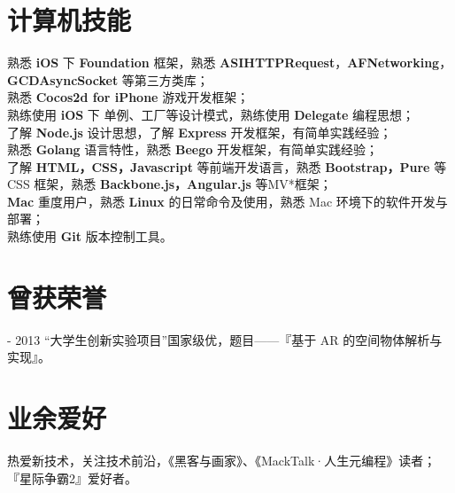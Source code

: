 \documentclass{res}
\begin{document}
\begin{resume}
\section{计算机技能}
\noindent
    熟悉 {\bf iOS} 下 {\bf Foundation} 框架，熟悉 {\bf ASIHTTPRequest}，{\bf AFNetworking}，{\bf GCDAsyncSocket} 等第三方类库；\\
    熟悉 {\bf Cocos2d for iPhone} 游戏开发框架；\\
    熟练使用 {\bf iOS} 下 单例、工厂等设计模式，熟练使用 {\bf Delegate} 编程思想；\\
    了解 {\bf Node.js} 设计思想，了解 {\bf Express} 开发框架，有简单实践经验；\\
    熟悉 {\bf Golang} 语言特性，熟悉 {\bf Beego} 开发框架，有简单实践经验；\\
    了解 {\bf HTML，CSS，Javascript} 等前端开发语言，熟悉 {\bf Bootstrap，Pure} 等 CSS 框架，熟悉 {\bf Backbone.js，Angular.js} 等MV*框架；\\
    {\bf Mac} 重度用户，熟悉 {\bf Linux} 的日常命令及使用，熟悉 Mac 环境下的软件开发与部署；\\
    熟练使用 {\bf Git} 版本控制工具。
 
\section{曾获荣誉}   
 - 2013 “大学生创新实验项目”国家级优，题目——『基于 AR 的空间物体解析与实现』。
 
\section{业余爱好}
\noindent
    热爱新技术，关注技术前沿，《黑客与画家》、《MackTalk·人生元编程》读者；\\
    『星际争霸2』爱好者。
 
\end{resume}
\end{document}
